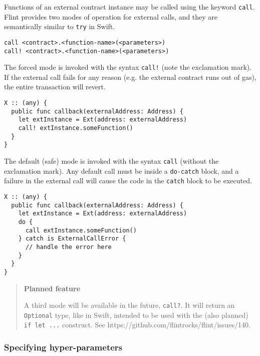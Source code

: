Functions of an external contract instance may be called using the keyword \texttt{call}. Flint provides two modes of operation for external calls, and they are semantically similar to \texttt{try} in Swift.

\begin{verbatim}
call <contract>.<function-name>(<parameters>)
call! <contract>.<function-name>(<parameters>)
\end{verbatim}

The forced mode is invoked with the syntax \texttt{call!} (note the exclamation mark). If the external call fails for any reason (e.g. the external contract runs out of gas), the entire transaction will revert.

\begin{verbatim}
X :: (any) {
  public func callback(externalAddress: Address) {
    let extInstance = Ext(address: externalAddress)
    call! extInstance.someFunction()
  }
}
\end{verbatim}

The default (safe) mode is invoked with the syntax \texttt{call} (without the exclamation mark). Any default call must be inside a \texttt{do-catch} block, and a failure in the external call will cause the code in the \texttt{catch} block to be executed.

\begin{verbatim}
X :: (any) {
  public func callback(externalAddress: Address) {
    let extInstance = Ext(address: externalAddress)
    do {
      call extInstance.someFunction()
    } catch is ExternalCallError {
      // handle the error here
    }
  }
}
\end{verbatim}

\begin{quote}
\textbf{Planned feature}

A third mode will be available in the future, \texttt{call?}. It will return an \texttt{Optional} type, like in Swift, intended to be used with the (also planned) \texttt{if let ...} construct. See https://github.com/flintrocks/flint/issues/140.
\end{quote}

\subsubsection{Specifying hyper-parameters}
\label{sec:appendix-b-specifying-hyper-parameters}

